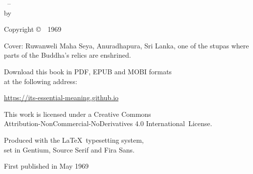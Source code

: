 \cleartoverso
\thispagestyle{empty}

{\copyrightsize
\centering
\setlength{\parindent}{0pt}%
\setlength{\parskip}{0.8\baselineskip}%

\thetitle\ -- \thesubtitle\\
by \theauthor

Copyright \copyright\ \theauthor\ 1969

Cover: Ruwanweli Maha Seya, Anuradhapura, Sri Lanka, one of the stupas where parts of the Buddha's relics are enshrined.

Download this book in PDF, EPUB and MOBI formats\\ at the following address:

\href{https://its-essential-meaning.github.io}{https://its-essential-meaning.github.io}

\vfill

{\footnotesize

This work is licensed under a Creative Commons\\
Attribution-NonCommercial-NoDerivatives 4.0 International~License.

Produced with the \LaTeX\ typesetting system,\\
set in Gentium, Source Serif and Fira Sans.

First published in May 1969

\theEditionInfo

}}
